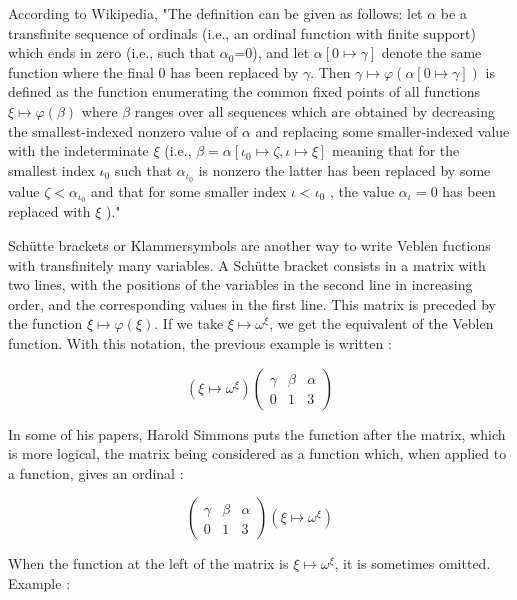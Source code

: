 \documentclass[10pt]{article}
\begin{document}
\bigskip

According to Wikipedia, "The definition can be given as follows: let \(\alpha\) be a transfinite sequence of ordinals (i.e., an ordinal function with finite support) which ends in zero (i.e., such that \(\alpha_0\)=0), and let \(\alpha[0\mapsto\gamma]\) denote the same function where the final 0 has been replaced by \(\gamma\). Then \(\gamma\mapsto\varphi(\alpha[0\mapsto\gamma])\) is defined as the function enumerating the common fixed points of all functions \( \xi \mapsto \varphi(\beta) \) where \( \beta \) ranges over all sequences which are obtained by decreasing the smallest-indexed nonzero value of \( \alpha \) and replacing some smaller-indexed value with the indeterminate \( \xi \) (i.e., \( \beta = \alpha [\iota_0 \mapsto \zeta, \iota \mapsto \xi ] \) meaning that for the smallest index \( \iota_0 \)  such that \( \alpha_{\iota_0} \)  is nonzero the latter has been replaced by some value \( \zeta < \alpha_{\iota_0} \)  and that for some smaller index \( \iota < \iota_0 \) , the value \( \alpha_\iota = 0 \) has been replaced with \( \xi \) )."

\bigskip

Schütte brackets or Klammersymbols are another way to write Veblen fuctions with transfinitely many variables. A Schütte bracket consists in a matrix with two lines, with the positions of the variables in the second line in increasing order, and the corresponding values in the first line. This matrix is preceded by the function  \( \xi  \mapsto \varphi(\xi) \). If we take \( \xi \mapsto \omega^\xi \), we get the equivalent of the Veblen function. With this notation, the previous example is written : 

\[
( \xi \mapsto \omega^\xi ) 
  \begin{pmatrix}
    \gamma & \beta & \alpha \\
    0 & 1 & 3
  \end{pmatrix}
\]

In some of his papers, Harold Simmons puts the function after the matrix, which is more logical, the matrix being considered as a function which, when applied to a function, gives an ordinal :

\[
  \begin{pmatrix}
    \gamma & \beta & \alpha \\
    0 & 1 & 3
  \end{pmatrix}
( \xi \mapsto \omega^\xi ) 
\]

\bigskip


When the function at the left of the matrix is \( \xi \mapsto \omega^\xi \), it is sometimes omitted. Example :
\end{document}
